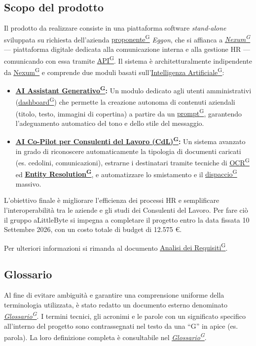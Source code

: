 \documentclass[a4paper,12pt]{article}
\providecommand{\glslink}[2]{\href{https://alittlebyte-19.github.io/Documentazione/glossario.html\#gls-#1}{\underline{#2}\textsuperscript{\scriptsize G}}}
\begin{document}
\subsection{Scopo del prodotto}
Il prodotto da realizzare consiste in una piattaforma software \textit{stand-alone} sviluppata su richiesta dell'azienda \glslink{committente-proponente}{proponente} \textit{Eggon}, che si affianca a \textit{\glslink{nexum}{Nexum}} — piattaforma digitale dedicata alla comunicazione interna e alla gestione HR — comunicando con essa tramite \glslink{api-application-programming-interface}{API}. Il sistema è architetturalmente indipendente da \glslink{nexum}{Nexum} e comprende due moduli basati sull'\glslink{intelligenza-artificiale-ai}{Intelligenza Artificiale}:
\begin{itemize}
    \item \textbf{\glslink{ai-assistant-generativo}{AI Assistant Generativo}:} Un modulo dedicato agli utenti amministrativi (\glslink{dashboard}{dashboard}) che permette la creazione autonoma di contenuti aziendali (titolo, testo, immagini di copertina) a partire da un \glslink{prompt}{prompt}, garantendo l'adeguamento automatico del tono e dello stile del messaggio.
    \item \textbf{\glslink{ai-co-pilot-per-consulenti-del-lavoro-cdl}{AI Co-Pilot per Consulenti del Lavoro (CdL)}:} Un sistema avanzato in grado di riconoscere automaticamente la tipologia di documenti caricati (es. cedolini, comunicazioni), estrarne i destinatari tramite tecniche di \glslink{ocr-riconoscimento-ottico-dei-caratteri}{OCR} ed \textbf{\glslink{entity-resolution}{Entity Resolution}}, e automatizzare lo smistamento e il \glslink{dispaccio}{dispaccio} massivo.
\end{itemize}

L'obiettivo finale è migliorare l'efficienza dei processi HR e semplificare l'interoperabilità tra le aziende e gli studi dei Consulenti del Lavoro. Per fare ciò il gruppo aLittleByte si impegna a completare il progetto entro la data fissata 10 Settembre 2026, con un costo totale di budget di 12.575 €. 

Per ulteriori informazioni si rimanda al documento \glslink{analisi-dei-requisiti-adr}{Analisi dei Requisiti}. 


\subsection{Glossario}

Al fine di evitare ambiguità e garantire una comprensione uniforme della terminologia utilizzata, è stato redatto un documento esterno denominato \textit{\glslink{glossario}{Glossario}}.
I termini tecnici, gli acronimi e le parole con un significato specifico all'interno del progetto sono contrassegnati nel testo da una ``G'' in apice (es. parola\textsuperscript{}). La loro definizione completa è consultabile nel \textit{\glslink{glossario}{Glossario}}.
\newpage
\end{document}
